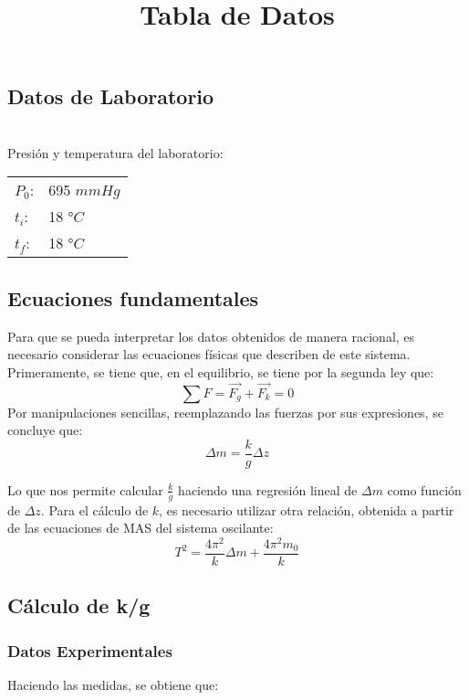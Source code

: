 \documentclass[a4paper,12pt]{article}
\begin{document}
\subsection{Datos de Laboratorio}
\begin{table}[h!]
\centering
\title{\textbf{Tabla de Datos}}
\\Presión y temperatura del laboratorio:


\begin{tabular}{|ll|}
\hline
$P_0$: & 695 $mmHg$ \\
$t_i$: & 18 °$C$ \\
$t_f$: & 18 °$C$ \\
\hline
\end{tabular}
\end{table}

\subsection{Ecuaciones fundamentales}
Para que se pueda interpretar los datos obtenidos de manera racional, es necesario considerar las ecuaciones físicas que describen de este sistema. Primeramente, se tiene que, en el equilibrio, se tiene por la segunda ley que:
$$\sum F = \vec{F_g} + \vec{F_k} = 0$$
Por manipulaciones sencillas, reemplazando las fuerzas por sus expresiones, se concluye que: 
\begin{equation}
  \label{k/g}
  \Delta m = \frac{k}{g} \Delta z
\end{equation}

Lo que nos permite calcular $\frac{k}{g}$ haciendo una regresión lineal de $\Delta m$ como función de $\Delta z$. Para el cálculo de $k$, es necesario utilizar otra relación, obtenida a partir de las ecuaciones de MAS del sistema oscilante:
\begin{equation}
  \label{k}
  T^2 = \frac{4\pi^2}{k}\Delta m + \frac{4\pi^2 m_0}{k}
\end{equation}

\subsection{Cálculo de k/g}

\subsubsection{Datos Experimentales}

Haciendo las medidas, se obtiene que:
\end{document}
